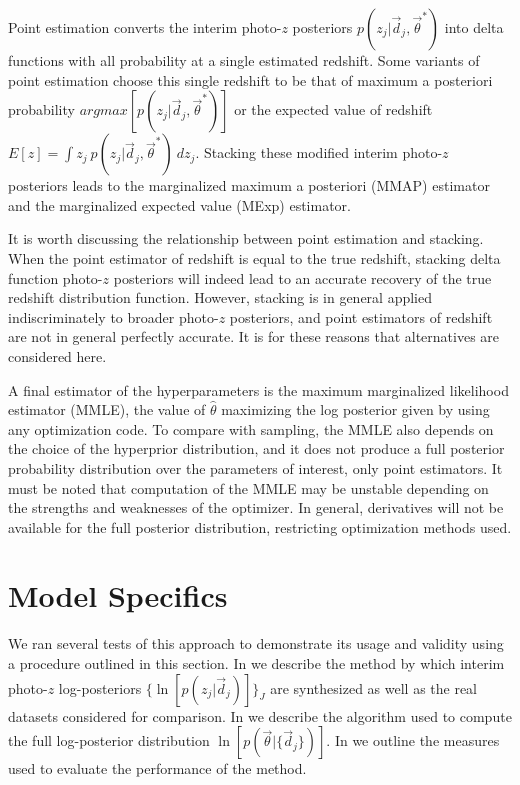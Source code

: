Point estimation converts the interim photo-$z$ posteriors $p(z_{j}|\vec{d}_{j},\vec{\theta}^{*})$ into delta functions with all probability at a single estimated redshift.  
Some variants of point estimation choose this single redshift to be that of maximum a posteriori probability $argmax[p(z_{j}|\vec{d}_{j},\vec{\theta}^{*})]$ or the expected value of redshift $E[z]=\int z_{j}\ p(z_{j}|\vec{d}_{j},\vec{\theta}^{*})\ dz_{j}$.  
Stacking these modified interim photo-$z$ posteriors leads to the marginalized maximum a posteriori (MMAP) estimator and the marginalized expected value (MExp) estimator.

It is worth discussing the relationship between point estimation and stacking.  
When the point estimator of redshift is equal to the true redshift, stacking delta function photo-$z$ posteriors will indeed lead to an accurate recovery of the true redshift distribution function.  
However, stacking is in general applied indiscriminately to broader photo-$z$ posteriors, and point estimators of redshift are not in general perfectly accurate.  
It is for these reasons that alternatives are considered here.

A final estimator of the hyperparameters is the maximum marginalized likelihood estimator (MMLE), the value of $\hat{\theta}$ maximizing the log posterior given by  using any optimization code.  
To compare with sampling, the MMLE also depends on the choice of the hyperprior distribution, and it does not produce a full posterior probability distribution over the 
parameters of interest, only point estimators.  
It must be noted that computation of the MMLE may be unstable depending on the strengths and weaknesses of the optimizer.  
In general, derivatives will not be available for the full posterior distribution, restricting optimization methods used.

\section{Model Specifics}

We ran several tests of this approach to demonstrate its usage and validity using a procedure outlined in this section.  
In  we describe the method by which interim photo-$z$ log-posteriors $\{\ln[p(z_{j}|\vec{d}_{j})]\}_{J}$ are synthesized as well as the real datasets considered for comparison.  
In  we describe the algorithm used to compute the full log-posterior distribution $\ln[p(\vec{\theta}|\{\vec{d}_{j}\})]$.  
In  we outline the measures used to evaluate the performance of the method.

